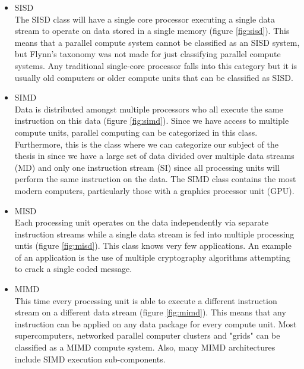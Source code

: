 \documentclass[a4paper, 11pt]{report}
\begin{document}
	\begin{itemize}
		\item SISD\\
		
The SISD class will have a single core processor executing a single data stream to operate on data stored in a single memory (figure \ref{fig:sisd}). This means that a parallel compute system cannot be classified as an SISD system, but Flynn's taxonomy was not made for just classifying parallel compute systems. Any traditional single-core processor falls into this category but it is usually old computers or older compute units that can be classified as SISD.
		\item {SIMD}\\
		
Data is distributed amongst multiple processors who all execute the same instruction on this data (figure \ref{fig:simd}). Since we have access to multiple compute units, parallel computing can be categorized in this class. Furthermore, this is the class where we can categorize our subject of the thesis in since we have a large set of data divided over multiple data streams (MD) and only one instruction stream (SI) since all processing units will perform the same instruction on the data. The SIMD class contains the most modern computers, particularly those with a graphics processor unit (GPU).
		\item MISD\\
		
Each processing unit operates on the data independently via separate instruction streams while a single data stream is fed into multiple processing untis (figure \ref{fig:misd}). This class knows very few applications. An example of an application is the use of multiple cryptography algorithms attempting to crack a single coded message.
		\item MIMD\\
		
This time every processing unit is able to execute a different instruction stream on a different data stream (figure \ref{fig:mimd}). This means that any instruction can be applied on any data package for every compute unit. Most supercomputers, networked parallel computer clusters and "grids" can be classified as a MIMD compute system. Also, many MIMD architectures include SIMD execution sub-components.
		\end{itemize}
\end{document}
